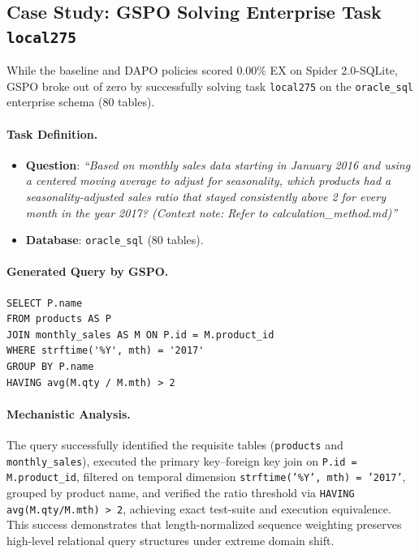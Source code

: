 \documentclass{article}
\theoremstyle{plain}
\theoremstyle{definition}
\theoremstyle{remark}
\begin{document}
\subsection{Case Study: GSPO Solving Enterprise Task \texttt{local275}}
While the baseline and DAPO policies scored $0.00\%$ EX on Spider 2.0-SQLite, GSPO broke out of zero by successfully solving task \texttt{local275} on the \texttt{oracle\_sql} enterprise schema (80 tables). 

\paragraph{Task Definition.}
\begin{itemize}[leftmargin=*,itemsep=1pt]
    \item \textbf{Question}: \emph{``Based on monthly sales data starting in January 2016 and using a centered moving average to adjust for seasonality, which products had a seasonality-adjusted sales ratio that stayed consistently above 2 for every month in the year 2017? (Context note: Refer to calculation\_method.md)''}
    \item \textbf{Database}: \texttt{oracle\_sql} (80 tables).
\end{itemize}

\paragraph{Generated Query by GSPO.}
\begin{verbatim}
SELECT P.name
FROM products AS P
JOIN monthly_sales AS M ON P.id = M.product_id
WHERE strftime('%Y', mth) = '2017'
GROUP BY P.name
HAVING avg(M.qty / M.mth) > 2
\end{verbatim}

\paragraph{Mechanistic Analysis.}
The query successfully identified the requisite tables (\texttt{products} and \texttt{monthly\_sales}), executed the primary key--foreign key join on \texttt{P.id = M.product\_id}, filtered on temporal dimension \texttt{strftime('\%Y', mth) = '2017'}, grouped by product name, and verified the ratio threshold via \texttt{HAVING avg(M.qty/M.mth) > 2}, achieving exact test-suite and execution equivalence. This success demonstrates that length-normalized sequence weighting preserves high-level relational query structures under extreme domain shift.
\end{document}
